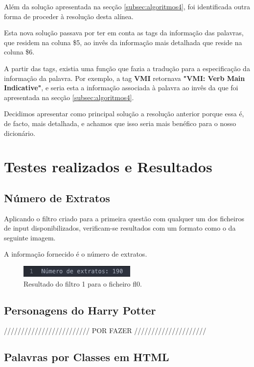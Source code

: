 \documentclass[11pt,a4paper]{report}
\begin{document}
Além da solução apresentada na secção \ref{subsec:algoritmos4}, foi identificada outra forma de proceder à resolução desta alínea.

Esta nova solução passava por ter em conta as tags da informação das palavras, que residem na coluna \$5, ao invês da informação mais detalhada que reside na coluna \$6.

A partir das tags, existia uma função que fazia a tradução para a especificação da informação da palavra. Por exemplo, a tag \textbf{VMI} retornava \textbf{"VMI: Verb Main Indicative"}, e seria esta a informação associada à palavra ao invês da que foi apresentada na secção \ref{subsec:algoritmos4}.

Decidimos apresentar como principal solução a resolução anterior porque essa é, de facto, mais detalhada, e achamos que isso seria mais benéfico para o nosso dicionário.


\section{Testes realizados e Resultados}
\subsection{Número de Extratos}

Aplicando o filtro criado para a primeira questão com qualquer um dos ficheiros de input disponibilizados, verificam-se resultados com um formato como o da seguinte imagem.

A informação fornecido é o número de extratos.

\begin{figure}[H]
\centering
\includegraphics[scale=0.7]{testes1.png}
\caption{Resultado do filtro 1 para o ficheiro fl0.}
\label{img:testes1}
\end{figure}


\subsection{Personagens do Harry Potter}

///////////////////////// POR FAZER /////////////////////


\newpage

\subsection{Palavras por Classes em HTML}
\end{document}
